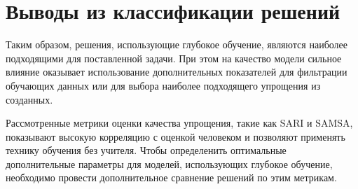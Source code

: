 \section*{Выводы из классификации решений}

Таким образом, решения, использующие глубокое обучение, являются наиболее подходящими для поставленной задачи. При этом на качество модели сильное влияние оказывает использование дополнительных показателей для фильтрации обучающих данных или для выбора наиболее подходящего упрощения из созданных.

Рассмотренные метрики оценки качества упрощения, такие как SARI и SAMSA, показывают высокую корреляцию с оценкой человеком и позволяют применять технику обучения без учителя. Чтобы определенить оптимальные дополнительные параметры для моделей, использующих глубокое обучение, необходимо провести дополнительное сравнение решений по этим метрикам.





